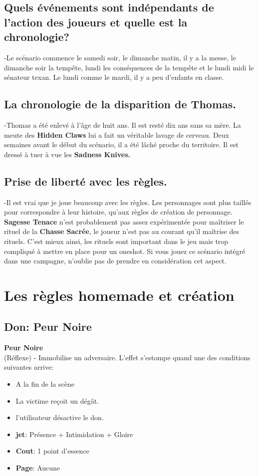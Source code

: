 \documentclass[oneside,12pt]{book}
\newcommand\don[6]{
\textbf{#1} \\
(#6) - #2
\begin{itemize}
\item{ \textbf{jet}: #3}
\item{ \textbf{Cout}: #4}
\item{ \textbf{Page}: #5}
\end{itemize}
\vspace{0.5cm}
}
\newcommand{\Jessica}{\textbf{Sagesse Tenace} }
\newcommand{\Hidden}{\textbf{Hidden Claws} }
\begin{document}
\begin{flushleft}
\subsection{Quels événements sont indépendants de l'action des joueurs et quelle est la chronologie?}
-Le scénario commence le samedi soir, le dimanche matin, il y a la messe, le dimanche soir la tempête, 
lundi les conséquences de la tempête et le lundi midi le sénateur texan. Le lundi comme le mardi, 
il y a peu d'enfants en classe. 
\subsection{La chronologie de la disparition de Thomas.} 
-Thomas a été enlevé à l'âge de huit ans. Il est resté dix ans sans sa mère. 
La meute des \Hidden lui a fait un véritable lavage de cerveau. Deux semaines avant le début du scénario, 
il a été lâché proche du territoire. Il est dressé à tuer à vue les \textbf{Sadness Knives.}
\subsection{Prise de liberté avec les règles.} 
-Il est vrai que je joue beaucoup avec les règles. Les personnages sont plus taillés pour correspondre à 
leur histoire, qu'aux règles de création de personnage.
\Jessica  n'est probablement pas assez expérimentée pour maîtriser le rituel de la \textbf{Chasse Sacrée},
le joueur n'est pas au courant qu'il maîtrise des rituels.
C'est mieux ainsi, les rituels sont important dans le jeu mais trop compliqué à mettre en place pour un oneshot.
Si vous jouez ce scénario intégré dans une campagne, n'oublie pas de prendre en considération cet aspect.

\clearpage

\section{Les règles homemade et création}
\subsection{Don: Peur Noire}
\label{Peur_mortelle}
\don{Peur Noire}{Immobilise un adversaire. L'effet s'estompe quand une des conditions suivantes arrive:
\begin{itemize}
\item A la fin de la scène
\item La victime reçoit un dégât. 
\item l'utilisateur désactive le don. 
\end{itemize}}{Présence + Intimidation + Gloire}{1 point d'essence}{Aucune}{Réflexe}



\end{flushleft}
\end{document}

